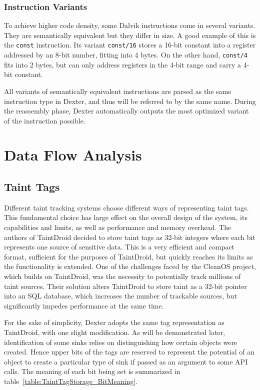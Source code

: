\documentclass[12pt,twoside,notitlepage]{report}
\begin{document}
\subsubsection{Instruction Variants}

To achieve higher code density, some Dalvik instructions come in several variants. They are semantically equivalent but they differ in size. A good example of this is the \verb$const$ instruction. Its variant \verb$const/16$ stores a 16-bit constant into a register addressed by an 8-bit number, fitting into 4 bytes. On the other hand, \verb$const/4$ fits into 2 bytes, but can only address registers in the 4-bit range and carry a 4-bit constant.

All variants of semantically equivalent instructions are parsed as the same instruction type in Dexter, and thus will be referred to  by the same name. During the reassembly phase, Dexter automatically outputs the most optimized variant of the instruction possible.

\section{Data Flow Analysis}
\label{section:DataFlowAnalysis}

\subsection{Taint Tags}

Different taint tracking systems choose different ways of representing taint tags. This fundamental choice has large effect on the overall design of the system, its capabilities and limits, as well as performance and memory overhead. The authors of TaintDroid decided to store taint tags as 32-bit integers where each bit represents one source of sensitive data. This is a very efficient and compact format, sufficient for the purposes of TaintDroid, but quickly reaches its limits as the functionality is extended. One of the challenges faced by the CleanOS project, which builds on TaintDroid, was the necessity to potentially track millions of taint sources. Their solution alters TaintDroid to store taint as a 32-bit pointer into an SQL database, which increases the number of trackable sources, but significantly impedes performance at the same time. 

For the sake of simplicity, Dexter adopts the same tag representation as TaintDroid, with one slight modification. As will be demonstrated later, identification of some sinks relies on distinguishing how certain objects were created. Hence upper bits of the tags are reserved to represent the potential of an object to create a particular type of sink if passed as an argument to some API calls. The meaning of each bit being set is summarized in table~\ref{table:TaintTagStorage_BitMeaning}.
\end{document}
